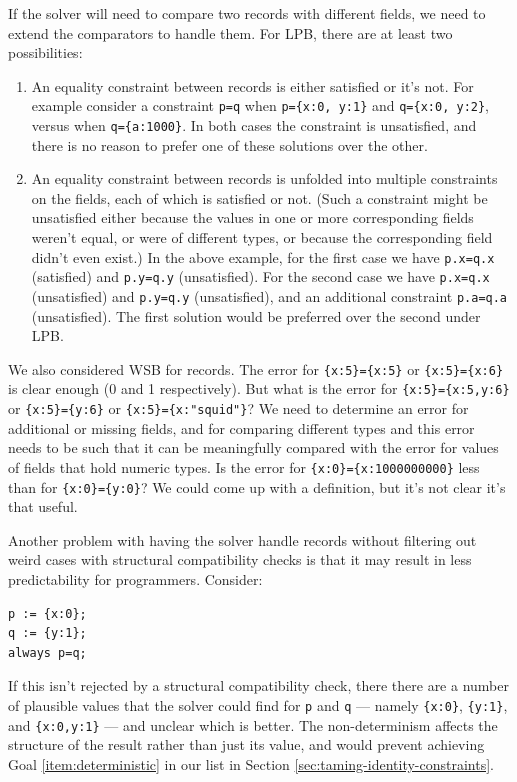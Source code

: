 \documentclass{article}
\begin{document}
If the solver will need to compare two records with different fields, we
need to extend the comparators to handle them.  For LPB, there are at
least two possibilities:
\begin{enumerate}
\item An equality constraint between records is either satisfied or
  it's not. For example consider a constraint \verb|p=q| when
  \verb|p={x:0, y:1}| and \verb|q={x:0, y:2}|, versus when
  \verb|q={a:1000}|.  In both cases the constraint is unsatisfied, and
  there is no reason to prefer one of these solutions over the other.

\item An equality constraint between records is unfolded into multiple
  constraints on the fields, each of which is satisfied or not.  (Such
  a constraint might be unsatisfied either because the values in one
  or more corresponding fields weren't equal, or were of different
  types, or because the corresponding field didn't even exist.)  In
  the above example, for the first case we have \verb|p.x=q.x|
  (satisfied) and \verb|p.y=q.y| (unsatisfied).  For the second case
  we have \verb|p.x=q.x| (unsatisfied) and \verb|p.y=q.y|
  (unsatisfied), and an additional constraint \verb|p.a=q.a|
  (unsatisfied).  The first solution would be preferred over the
  second under LPB.
\end{enumerate}

We also considered WSB for records.  The error for \verb|{x:5}={x:5}|
or \verb|{x:5}={x:6}| is clear enough (0 and 1 respectively).  But
what is the error for \verb|{x:5}={x:5,y:6}| or \verb|{x:5}={y:6}| or
\verb|{x:5}={x:"squid"}|?  We need to determine an error for
additional or missing fields, and for comparing different types and
this error needs to be such that it can be meaningfully compared with
the error for values of fields that hold numeric types.  Is the error
for \verb|{x:0}={x:1000000000}| less than for \verb|{x:0}={y:0}|?  We
could come up with a definition, but it's not clear it's that useful.

Another problem with having the solver handle records without
filtering out weird cases with structural compatibility checks is that
it may result in less predictability for programmers.  Consider:

\begin{verbatim}
p := {x:0};
q := {y:1};
always p=q;
\end{verbatim}

If this isn't rejected by a structural compatibility check, there
there are a number of plausible values that the solver could find for
\texttt{p} and \texttt{q} --- namely \verb|{x:0}|, \verb|{y:1}|, and
\verb|{x:0,y:1}| --- and unclear which is better.  The non-determinism
affects the structure of the result rather than just its value, and
would prevent achieving Goal \ref{item:deterministic} in our list in
Section \ref{sec:taming-identity-constraints}.
\end{document}
